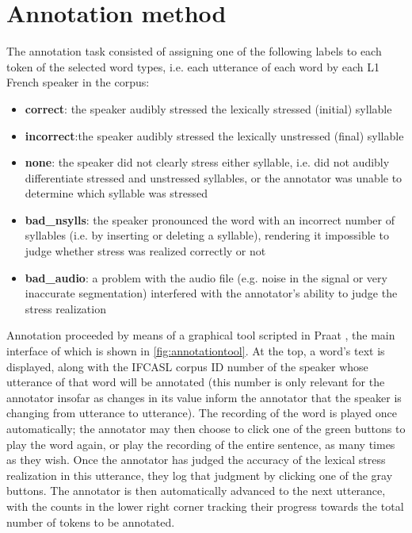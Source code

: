 	
	
	
	\section{Annotation method}
	\label{sec:lexstress:method}

	The annotation task consisted of assigning one of the following labels to 
	each token of the selected word types, i.e. each utterance of each word by each L1 French speaker in the corpus:
	
	\begin{itemize}
	\item{\textbf{correct}: the speaker audibly stressed the lexically stressed (initial) syllable}
	\item{\textbf{incorrect}:the speaker audibly stressed the lexically unstressed (final) syllable}
	\item{\textbf{none}: the speaker did not clearly stress either syllable, i.e. did not audibly differentiate stressed and unstressed syllables, or the annotator was unable to determine which syllable was stressed}
	\item{\textbf{bad\_nsylls}: the speaker pronounced the word with an incorrect number of syllables (i.e. by inserting or deleting a syllable), rendering it impossible to judge whether stress was realized correctly or not}
	\item{\textbf{bad\_audio}: a problem with the audio file (e.g. noise in the signal or very inaccurate segmentation) interfered with the annotator's ability to judge the stress realization}
	 \end{itemize}
	
	Annotation proceeded by means of a graphical tool scripted in Praat \parencite{Boersma2014}, the main interface of which is shown in \cref{fig:annotationtool}. At the top, a word's text is displayed, along with the IFCASL corpus ID number of the speaker whose utterance of that word will be annotated (this number is only relevant for the annotator insofar as changes in its value inform the annotator that the speaker is changing from utterance to utterance). The recording of the word
is played once automatically; the annotator may then choose to click one of the green buttons to play the word again, or play the recording of the entire sentence, as many times as they wish. Once the annotator has judged the accuracy of the lexical stress realization in this utterance, they log that judgment by clicking one of the gray buttons. The annotator is then automatically advanced to the next utterance, with the counts in the lower right corner tracking their progress towards the total number of tokens to be annotated. 

